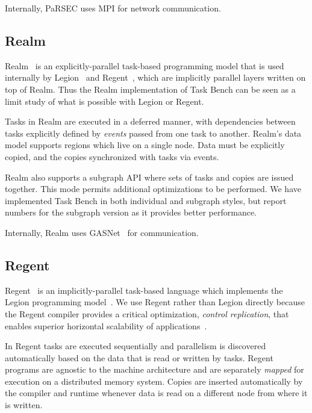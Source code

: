 
Internally, PaRSEC uses MPI for network communication.

\subsection{Realm}

Realm~\cite{Realm14} is an explicitly-parallel task-based programming
model that is used internally by Legion~\cite{Legion12} and
Regent~\cite{Regent15}, which are implicitly parallel layers written
on top of Realm. Thus the Realm implementation of Task Bench can be
seen as a limit study of what is possible with Legion or Regent.

Tasks in Realm are executed in a deferred manner, with dependencies
between tasks explicitly defined by \emph{events} passed from one task
to another. Realm's data model supports regions which live on a single
node. Data must be explicitly copied, and the copies synchronized with
tasks via events.

Realm also supports a subgraph API where sets of tasks and copies are
issued together. This mode permits additional optimizations to be
performed. We have implemented Task Bench in both individual and
subgraph styles, but report numbers for the subgraph version as it
provides better performance.

Internally, Realm uses GASNet~\cite{GASNET07} for communication.

\subsection{Regent}

Regent~\cite{Regent15} is an implicitly-parallel task-based language
which implements the Legion programming model~\cite{Legion12}. We use
Regent rather than Legion directly because the Regent compiler
provides a critical optimization, \emph{control replication}, that
enables superior horizontal scalability of
applications~\cite{ControlReplication17}.

In Regent tasks are executed sequentially and parallelism is
discovered automatically based on the data that is read or written by
tasks. Regent programs are agnostic to the machine architecture and
are separately \emph{mapped} for execution on a distributed memory
system. Copies are inserted automatically by the compiler and runtime
whenever data is read on a different node from where it is written.

